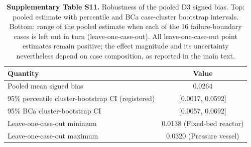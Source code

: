 \begin{table}[htbp]
\centering
\caption{\textbf{Supplementary Table S11.} Robustness of the pooled D3 signed bias. Top: pooled estimate with percentile and BCa case-cluster bootstrap intervals. Bottom: range of the pooled estimate when each of the 16 failure-boundary cases is left out in turn (leave-one-case-out). All leave-one-case-out point estimates remain positive; the effect magnitude and its uncertainty nevertheless depend on case composition, as reported in the main text.}
\label{tab:si_d3_loco}
\SITableFont
\begin{tabular}{@{}lc@{}}
\toprule
\textbf{Quantity} & \textbf{Value} \\
\midrule
Pooled mean signed bias & 0.0264 \\
95\% percentile cluster-bootstrap CI (registered) & [0.0017, 0.0592] \\
95\% BCa cluster-bootstrap CI & [0.0057, 0.0692] \\
Leave-one-case-out minimum & 0.0138 (Fixed-bed reactor) \\
Leave-one-case-out maximum & 0.0320 (Pressure vessel) \\
\bottomrule
\end{tabular}
\end{table}
